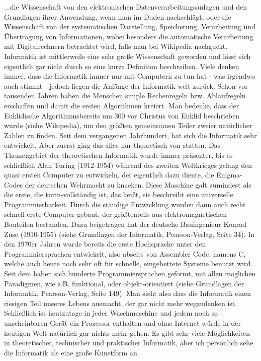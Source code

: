 \documentclass[12pt]{scrartcl}
\begin{document}
...die Wissenschaft von den elektronischen Datenverarbeitungsanlagen und den Grundlagen ihrer Anwendung, wenn man im Duden nachschlägt, oder die Wissenschaft von der systematischen Darstellung, Speicherung, Verarbeitung und Übertragung von Informationen, wobei besonders die automatische Verarbeitung mit Digitalrechnern betrachtet wird, falls man bei Wikipedia nachguckt.
\newline
\newline
Informatik ist mittlerweile eine sehr große Wissenschaft geworden und lässt sich eigentlich gar nicht durch so eine kurze Definition beschreiben. Viele denken immer, dass die Informatik immer nur mit Computern zu tun hat - was irgendwo auch stimmt - jedoch liegen die Anfänge der Informatik weit zurück. Schon vor tausenden Jahren haben die Menschen simple Rechenregeln bzw. Ablaufregeln erschaffen und damit die ersten Algorithmen kreiert. Man bedenke, dass der \glqq Euklidische Algorithmus\grqq  bereits um 300 vor Christus von Euklid beschrieben wurde (siehe Wikipedia), um den größten gemeinsamen Teiler zweier natürlicher Zahlen zu finden.
\newline
\newline
Seit dem vergangenen Jahrhundert, hat sich die Informatik sehr entwickelt. Aber zuerst ging das alles nur theoretisch von statten. Das Themengebiet der theoretischen Informatik wurde immer präsenter, bis es schließlich Alan Turing (1912-1954) während des zweiten Weltkrieges gelang den quasi ersten Computer zu entwickeln, der eigentlich dazu diente, die Enigma-Codes der deutschen Wehrmacht zu knacken. Diese Maschine galt zumindest als die erste, die turin-vollständig ist, das heißt, sie beschreibt eine universelle Programmierbarkeit.
\newline
Durch die ständige Entwicklung wurden dann auch recht schnell erste Computer gebaut, der größtenteils aus elektromagnetischen Bauteilen bestanden. Dazu beigetragen hat der deutsche Bauingenieur Konrad Zuse (1910-1955) (siehe \glqq Grundlagen der Informatik\grqq  , Pearson-Verlag, Seite 34).
\newline
In den 1970er Jahren wurde bereits die erste Hochsprache unter den Programmiersprachen entwickelt, also abseits von Assembler Code, namens \glqq C\grqq , welche auch heute noch sehr oft für schnelle, eingebettete Systeme benutzt wird. Seit dem haben sich hunderte Programmiersprachen geformt, mit allen möglichen Paradigmen, wie z.B. funktional, oder objekt-orientiert (siehe \glqq Grundlagen der Informatik\grqq  , Pearson-Verlag, Seite 149).
\newline
\newline
Man sieht also dass die Informatik einen riesigen Teil unseres Lebens ausmacht, der gar nicht mehr wegzudenken ist. Schließlich ist heutzutage in jeder Waschmaschine und jedem noch so unscheinbaren Gerät ein Prozessor enthalten und ohne Internet würde in der heutigen Welt natürlich gar nichts mehr gehen.
\newline
Es gibt sehr viele Möglichkeiten in theoretischer, technischer und praktischer Informatik, aber ich persönlich sehe die Informatik als eine große Kunstform an.
\end{document}
